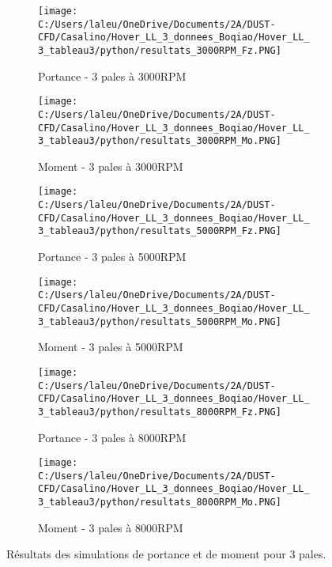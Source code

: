\documentclass{article}
\begin{document}
\clearpage

\begin{figure}[h]
	\centering
	
	\begin{subfigure}{0.45\textwidth}
		\texttt{[image: C:/Users/laleu/OneDrive/Documents/2A/DUST-CFD/Casalino/Hover\_LL\_3\_donnees\_Boqiao/Hover\_LL\_3\_tableau3/python/resultats\_3000RPM\_Fz.PNG]}
		\caption{Portance - 3 pales à 3000RPM}
	\end{subfigure}
	\hfill
	\begin{subfigure}{0.45\textwidth}
		\texttt{[image: C:/Users/laleu/OneDrive/Documents/2A/DUST-CFD/Casalino/Hover\_LL\_3\_donnees\_Boqiao/Hover\_LL\_3\_tableau3/python/resultats\_3000RPM\_Mo.PNG]}
		\caption{Moment - 3 pales à 3000RPM}
	\end{subfigure}
	
	\begin{subfigure}{0.45\textwidth}
		\texttt{[image: C:/Users/laleu/OneDrive/Documents/2A/DUST-CFD/Casalino/Hover\_LL\_3\_donnees\_Boqiao/Hover\_LL\_3\_tableau3/python/resultats\_5000RPM\_Fz.PNG]}
		\caption{Portance - 3 pales à 5000RPM}
	\end{subfigure}
	\hfill
	\begin{subfigure}{0.45\textwidth}
		\texttt{[image: C:/Users/laleu/OneDrive/Documents/2A/DUST-CFD/Casalino/Hover\_LL\_3\_donnees\_Boqiao/Hover\_LL\_3\_tableau3/python/resultats\_5000RPM\_Mo.PNG]}
		\caption{Moment - 3 pales à 5000RPM}
	\end{subfigure}
	
	\begin{subfigure}{0.45\textwidth}
		\texttt{[image: C:/Users/laleu/OneDrive/Documents/2A/DUST-CFD/Casalino/Hover\_LL\_3\_donnees\_Boqiao/Hover\_LL\_3\_tableau3/python/resultats\_8000RPM\_Fz.PNG]}
		\caption{Portance - 3 pales à 8000RPM}
	\end{subfigure}
	\hfill
	\begin{subfigure}{0.45\textwidth}
		\texttt{[image: C:/Users/laleu/OneDrive/Documents/2A/DUST-CFD/Casalino/Hover\_LL\_3\_donnees\_Boqiao/Hover\_LL\_3\_tableau3/python/resultats\_8000RPM\_Mo.PNG]}
		\caption{Moment - 3 pales à 8000RPM}
	\end{subfigure}
	
	\caption{Résultats des simulations de portance et de moment pour 3 pales.}
	\label{fig:grid_rpm_3pales}
\end{figure}
\end{document}
